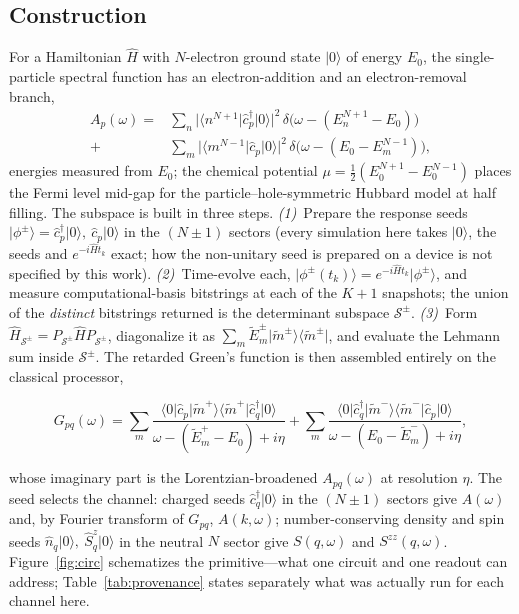 \subsection{Construction}
For a Hamiltonian $\hat H$ with $N$-electron ground state $\lvert 0\rangle$ of energy $E_0$, the
single-particle spectral function has an electron-addition and an electron-removal branch,
\begin{equation}
\begin{aligned}
A_{p}(\omega)=&\sum_{n}\bigl|\langle n^{N+1}\lvert \hat c^\dagger_p\rvert 0\rangle\bigr|^{2}\,
\delta\!\bigl(\omega-(E^{N+1}_n-E_0)\bigr)\\
+&\sum_{m}\bigl|\langle m^{N-1}\lvert \hat c_p\rvert 0\rangle\bigr|^{2}\,
\delta\!\bigl(\omega-(E_0-E^{N-1}_m)\bigr),
\end{aligned}
\label{eq:lehmann}
\end{equation}
energies measured from $E_0$; the chemical potential $\mu=\tfrac12(E^{N+1}_0-E^{N-1}_0)$ places the
Fermi level mid-gap for the particle--hole-symmetric Hubbard model at half filling. The subspace is
built in three steps. \emph{(1)}~Prepare the response seeds
$\lvert\phi^{\pm}\rangle=\hat c^{\dagger}_p\lvert 0\rangle,\ \hat c_p\lvert 0\rangle$ in the $(N{\pm}1)$ sectors (every simulation here takes $\lvert 0\rangle$, the seeds and $e^{-i\hat Ht_k}$ exact; how the non-unitary seed is prepared on a device is not specified by this work). \emph{(2)}~Time-evolve each, $\lvert\phi^{\pm}(t_k)\rangle=e^{-i\hat H
t_k}\lvert\phi^{\pm}\rangle$, and measure computational-basis bitstrings at each of the $K{+}1$
snapshots; the union of the \emph{distinct} bitstrings returned is the determinant subspace
$\mathcal S^{\pm}$. \emph{(3)}~Form $\hat H_{\mathcal S^{\pm}}=P_{\mathcal S^{\pm}}\hat H P_{\mathcal
S^{\pm}}$, diagonalize it as $\sum_m \tilde E^{\pm}_m\lvert\tilde m^{\pm}\rangle\langle\tilde
m^{\pm}\rvert$, and evaluate the Lehmann sum inside $\mathcal S^{\pm}$. The retarded Green's function is
then assembled entirely on the classical processor,
\begin{widetext}
\begin{equation}
G_{pq}(\omega)=\sum_{m}\frac{\langle 0\lvert \hat c_p\rvert\tilde m^{+}\rangle\langle\tilde m^{+}\lvert \hat
c^\dagger_q\rvert 0\rangle}{\omega-(\tilde E^{+}_m-E_0)+i\eta}
+\sum_{m}\frac{\langle 0\lvert \hat c^{\dagger}_q\rvert\tilde m^{-}\rangle\langle\tilde m^{-}\lvert \hat
c_p\rvert 0\rangle}{\omega-(E_0-\tilde E^{-}_m)+i\eta},
\label{eq:green}
\end{equation}
\end{widetext}
whose imaginary part is the Lorentzian-broadened $A_{pq}(\omega)$ at resolution $\eta$. The seed selects
the channel: charged seeds $\hat c^\dagger_q\lvert 0\rangle$ in the $(N{\pm}1)$ sectors give $A(\omega)$
and, by Fourier transform of $G_{pq}$, $A(k,\omega)$; number-conserving density and spin seeds
$\hat n_q\lvert 0\rangle,\ \hat S^z_q\lvert 0\rangle$ in the neutral $N$ sector give $S(q,\omega)$ and
$S^{zz}(q,\omega)$. Figure~\ref{fig:circ} schematizes the
primitive---what one circuit and one readout can address; Table~\ref{tab:provenance} states separately
what was actually run for each channel here.

